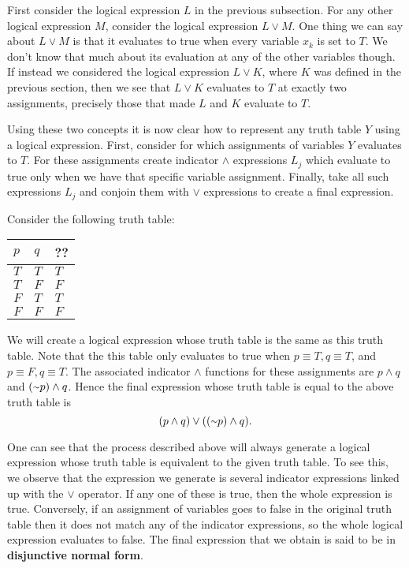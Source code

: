First consider the logical expression $L$ in the previous subsection. For any other logical expression $M$, consider the logical expression $L \lor M$. One thing we can say about $L \lor M$ is that it evaluates to true when every variable $x_k$ is set to $T$. We don't know that much about its evaluation at any of the other variables though. If instead we considered the logical expression $L \lor K$, where $K$ was defined in the previous section, then we see that $L \lor K$ evaluates to $T$ at exactly two assignments, precisely those that made $L$ and $K$ evaluate to $T$.

Using these two concepts it is now clear how to represent any truth table $Y$ using a logical expression. First, consider for which assignments of variables $Y$ evaluates to $T$. For these assignments create indicator $\land$ expressions $L_j$ which evaluate to true only when we have that specific variable assignment. Finally, take all such expressions $L_j$ and conjoin them with $\lor$ expressions to create a final expression. 

\begin{example}
Consider the following truth table:

\begin{table}[h]
\centering
\begin{tabular}{|l|l|l|}
\hline
$p$ & $q$ & ??\\ \hline
$T$ & $T$ & $T$ \\ \hline
$T$ & $F$ & $F$ \\ \hline
$F$ & $T$ & $T$ \\ \hline
$F$ & $F$ & $F$ \\ \hline
\end{tabular}
\end{table}

We will create a logical expression whose truth table is the same as this truth table. Note that the this table only evaluates to true when $p \equiv T, q \equiv T$, and $p \equiv F, q \equiv T$. The associated indicator $\land$ functions for these assignments are $p \land q$ and $(\shortsim p) \land q$. Hence the final expression whose truth table is equal to the above truth table is
\[(p \land q) \lor ((\shortsim p) \land q).\]
\end{example}

One can see that the process described above will always generate a logical expression whose truth table is equivalent to the given truth table. To see this, we observe that the expression we generate is several indicator expressions linked up with the $\lor$ operator. If any one of these is true, then the whole expression is true. Conversely, if an assignment of variables goes to false in the original truth table then it does not match any of the indicator expressions, so the whole logical expression evaluates to false. The final expression that we obtain is said to be in \textbf{disjunctive normal form}.

